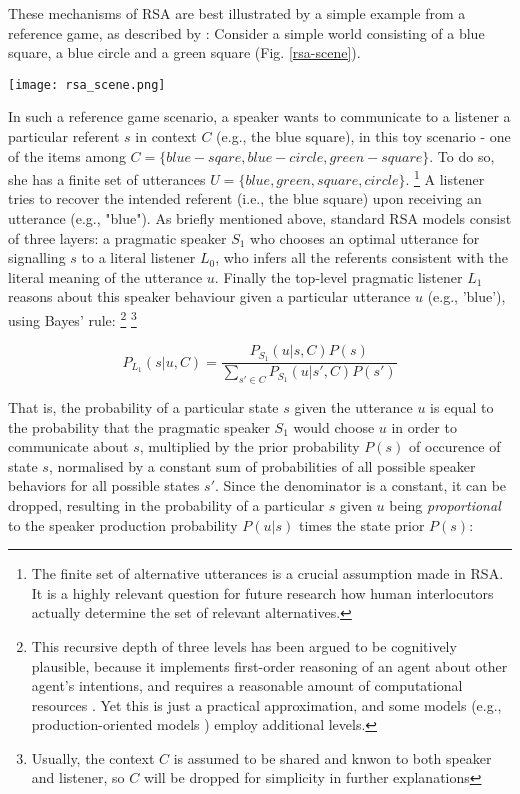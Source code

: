 These mechanisms of RSA are best illustrated by a simple example from a reference game, as described by \textcite{frank2012predicting}:
Consider a simple world consisting of a blue square, a blue circle and a green square (Fig. \ref{rsa-scene}).
\begin{figure*}[t]
	\begin{center}
		\texttt{[image: rsa\_scene.png]}
	\end{center}
	\vspace{-0.3cm}
	\caption{A simple reference resolution example scenario: the context $C$ consists of three possible referents \parencite{frank2012predicting}}
	\label{rsa-scene}
\end{figure*}
In such a reference game scenario, a speaker wants to communicate to a listener a particular referent $s$ in context $C$ (e.g., the blue square), in this toy scenario - one of the items among $C = \{blue-sqare, blue-circle, green-square\}$. To do so, she has a finite set of utterances $U = \{blue, green, square, circle\}$.  \footnote{The finite set of alternative utterances is a crucial assumption made in RSA. It is a highly relevant question for future research how human interlocutors actually determine the set of relevant alternatives.} A listener tries to recover the intended referent (i.e., the blue square) upon receiving an utterance (e.g., "blue"). 
As briefly mentioned above, standard RSA models consist of three layers: a pragmatic speaker $S_1$ who chooses an optimal utterance for signalling $s$ to a literal listener $L_0$, who infers all the referents consistent with the literal meaning of the utterance $u$. Finally the top-level pragmatic listener $L_1$ reasons about this speaker behaviour given a particular utterance $u$ (e.g., 'blue'), using Bayes' rule: \footnote{This recursive depth of three levels has been argued to be cognitively plausible, because it implements first-order reasoning of an agent about other agent's intentions, and requires a reasonable amount of computational resources \parencite{frank2012predicting}. Yet this is just a practical approximation, and some models (e.g., production-oriented models ) employ additional levels.} \footnote{Usually, the context $C$ is assumed to be shared and knwon to both speaker and listener, so $C$ will be dropped for simplicity in further explanations}
 
$$P_{L_1}(s | u, C) = \frac{P_{S_1}(u | s, C) P(s)}{\sum_{s' \in C} P_{S_1}(u | s', C) P(s')}$$


That is, the probability of a particular state $s$ given the utterance $u$ is equal to the probability that the pragmatic speaker $S_1$ would choose $u$ in order to communicate about $s$, multiplied by the prior probability $P(s)$ of occurence of state $s$, normalised by a constant sum of probabilities of all possible speaker behaviors for all possible states $s'$. Since the denominator is a constant, it can be dropped, resulting in the probability of a particular $s$ given $u$ being \emph{proportional} to the speaker production probability $P(u | s)$ times the state prior $P(s)$:

